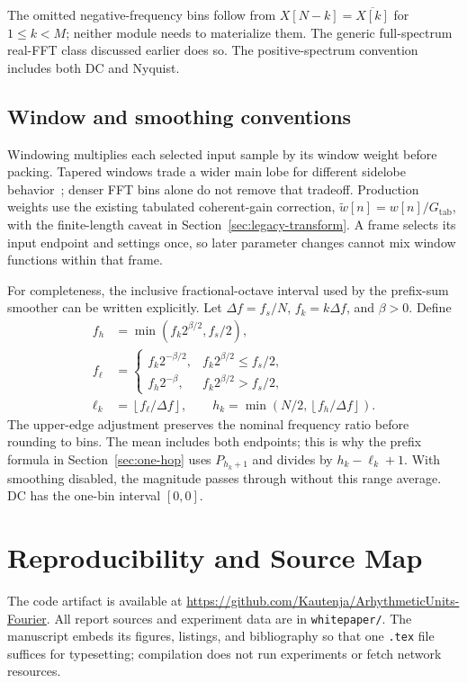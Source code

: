 \documentclass[11pt,letterpaper]{article}
\newcommand{\code}[1]{\texttt{#1}}
\newcommand{\floor}[1]{\left\lfloor #1\right\rfloor}
\newcommand{\repo}{\url{https://github.com/Kautenja/ArhythmeticUnits-Fourier}}
\begin{document}
The omitted negative-frequency bins follow from
$X[N-k]=\overline{X[k]}$ for $1\le k<M$; neither module needs to materialize
them. The generic full-spectrum real-FFT class discussed earlier does so.
The positive-spectrum convention includes both DC and Nyquist.

\subsection{Window and smoothing conventions}
Windowing multiplies each selected input sample by its window weight before
packing. Tapered windows trade a wider main lobe for different sidelobe
behavior~\cite{harris1978}; denser FFT bins alone do not remove that tradeoff.
Production weights use the existing tabulated coherent-gain correction,
$\widetilde w[n]=w[n]/G_{\mathrm{tab}}$, with the finite-length caveat in
Section~\ref{sec:legacy-transform}. A frame selects its input endpoint and
settings once, so later parameter changes cannot mix window functions within
that frame.

For completeness, the inclusive fractional-octave interval used by the
prefix-sum smoother can be written explicitly. Let $\Delta f=f_s/N$,
$f_k=k\Delta f$, and $\beta>0$. Define
\begin{align}
 f_h&=\min(f_k2^{\beta/2},f_s/2),\\
 f_\ell&=\begin{cases}
 f_k2^{-\beta/2},&f_k2^{\beta/2}\le f_s/2,\\
 f_h2^{-\beta},&f_k2^{\beta/2}>f_s/2,
 \end{cases}\\
 \ell_k&=\floor{f_\ell/\Delta f},\qquad
 h_k=\min(N/2,\floor{f_h/\Delta f}).
 \label{eq:octave-bounds}
\end{align}
The upper-edge adjustment preserves the nominal frequency ratio before
rounding to bins. The mean includes both endpoints; this is why the prefix
formula in Section~\ref{sec:one-hop} uses $P_{h_k+1}$ and divides by
$h_k-\ell_k+1$. With smoothing disabled, the magnitude passes through
without this range average. DC has the one-bin interval $[0,0]$.

\section{Reproducibility and Source Map}
The code artifact is available at \repo. All report sources and experiment data
are in \code{whitepaper/}. The manuscript embeds its figures, listings, and
bibliography so that one \code{.tex} file suffices for typesetting; compilation
does not run experiments or fetch network resources.
\end{document}
